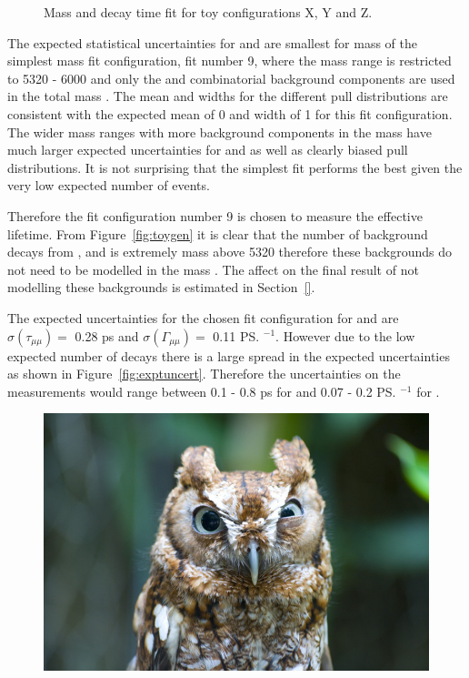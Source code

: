 {\begin{figure}[htbp]
    \caption{Mass and decay time \ml fit for toy configurations X, Y and Z.}
    \label{fig:toyegs}
\end{figure}


The expected statistical uncertainties for \tmumu and \Gmumu are smallest for mass of the simplest mass fit configuration, fit number 9, where the mass range is restricted to 5320 - 6000 \mevcc and only the \bsmumu and combinatorial background components are used in the total mass \pdf. The mean and widths for the different pull distributions are consistent with the expected mean of 0 and width of 1 for this fit configuration. The wider mass ranges with more background components in the mass \pdf have much larger expected uncertainties for \tmumu and \Gmumu as well as clearly biased pull distributions. It is not surprising that the simplest fit performs the best given the very low expected number of events. 

Therefore the fit configuration number 9 is chosen to measure the \bsmumu effective lifetime. From Figure~\ref{fig:toygen} it is clear that the number of background decays from \bdmumu, \bhh and \lambdab is extremely mass above 5320 \mevcc therefore these backgrounds do not need to be modelled in the mass \pdf. The affect on the final result of not modelling these backgrounds is estimated in Section~\ref{}.

The expected uncertainties for the chosen fit configuration for \tmumu and \Gmumu are $\sigma \left ( \tau_{\mu\mu}  \right ) = $ 0.28 ps and  $\sigma \left ( \Gamma_{\mu\mu}  \right ) = $ 0.11 \ps$^{-1}$. However due to the low expected number of decays there is a large spread in the expected uncertainties as shown in Figure~\ref{fig:exptuncert}. Therefore the uncertainties on the measurements would range between 0.1 - 0.8 ps for \tmumu and 0.07 - 0.2 \ps$^{-1}$ for \Gmumu.


\begin{figure}[htbp]
    \centering
        \includegraphics[width= \textwidth]{./Figs/placeholder.jpeg}


\end{figure}}

